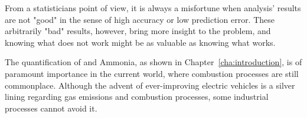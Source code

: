 From a statisticians point of view, it is always a misfortune when analysis' results are not "good" in the sense of high accuracy or low prediction error. These arbitrarily "bad" results, however, bring more insight to the problem, and knowing what does not work might be as valuable as knowing what works.

The quantification of \nox and Ammonia, as shown in Chapter~\ref{cha:introduction}, is of paramount importance in the current world, where combustion processes are still commonplace. Although the advent of ever-improving electric vehicles is a silver lining regarding gas emissions and combustion processes, some industrial processes cannot avoid it. 



